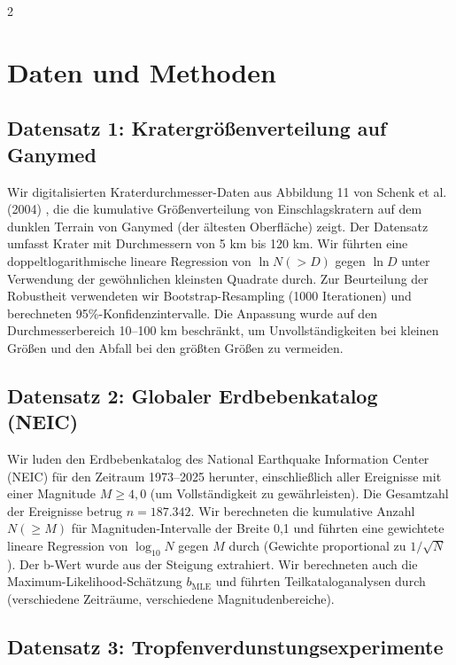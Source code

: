 \documentclass[11pt,a4paper]{article}
\begin{document}
\begin{multicols}{2}
		\section{Daten und Methoden}
		
		\subsection{Datensatz 1: Kratergrößenverteilung auf Ganymed}
		
		Wir digitalisierten Kraterdurchmesser-Daten aus Abbildung 11 von Schenk et al. (2004) \cite{Schenk2004}, die die kumulative Größenverteilung von Einschlagskratern auf dem dunklen Terrain von Ganymed (der ältesten Oberfläche) zeigt. Der Datensatz umfasst Krater mit Durchmessern von 5 km bis 120 km. Wir führten eine doppeltlogarithmische lineare Regression von \(\ln N(>D)\) gegen \(\ln D\) unter Verwendung der gewöhnlichen kleinsten Quadrate durch. Zur Beurteilung der Robustheit verwendeten wir Bootstrap-Resampling (1000 Iterationen) und berechneten 95\%-Konfidenzintervalle. Die Anpassung wurde auf den Durchmesserbereich 10–100 km beschränkt, um Unvollständigkeiten bei kleinen Größen und den Abfall bei den größten Größen zu vermeiden.
		
		\subsection{Datensatz 2: Globaler Erdbebenkatalog (NEIC)}
		
		Wir luden den Erdbebenkatalog des National Earthquake Information Center (NEIC) \cite{USGSNEIC} für den Zeitraum 1973–2025 herunter, einschließlich aller Ereignisse mit einer Magnitude \(M \ge 4,0\) (um Vollständigkeit zu gewährleisten). Die Gesamtzahl der Ereignisse betrug \(n = 187.342\). Wir berechneten die kumulative Anzahl \(N(\ge M)\) für Magnituden-Intervalle der Breite 0,1 und führten eine gewichtete lineare Regression von \(\log_{10} N\) gegen \(M\) durch (Gewichte proportional zu \(1/\sqrt{N}\)). Der b-Wert wurde aus der Steigung extrahiert. Wir berechneten auch die Maximum-Likelihood-Schätzung \(b_{\text{MLE}}\) \cite{Aki1965} und führten Teilkataloganalysen durch (verschiedene Zeiträume, verschiedene Magnitudenbereiche).
		
		\subsection{Datensatz 3: Tropfenverdunstungsexperimente}
		

\end{multicols}
\end{document}
